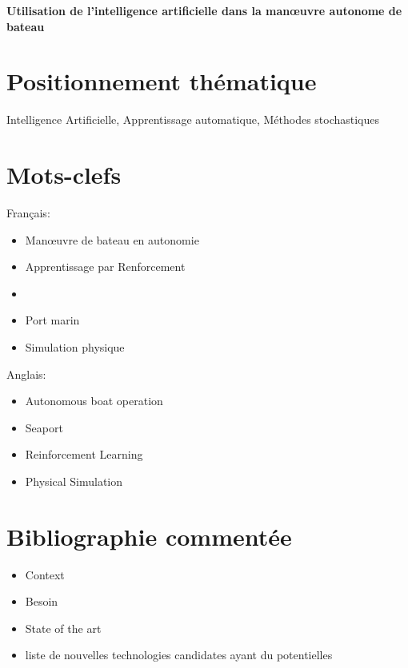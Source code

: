 \documentclass[12pt,a4paper]{extarticle}
\begin{document}
\begin{center}

\huge{ \bfseries Utilisation de l'intelligence artificielle dans la manœuvre autonome de bateau}
\end{center}

\section*{Positionnement thématique}

Intelligence Artificielle, Apprentissage automatique, Méthodes stochastiques

\section*{Mots-clefs}

\begin{multicols}{2}

Français:

\begin{itemize}

\item Manœuvre de bateau en autonomie
\item Apprentissage par Renforcement
\item 
\item Port marin
\item Simulation physique



\end{itemize}

Anglais:

\begin{itemize}

\item Autonomous boat operation
\item Seaport
\item Reinforcement Learning
\item Physical Simulation


\end{itemize}

\end{multicols}

\section*{Bibliographie commentée}

\begin{itemize}
\item Context
\item Besoin
\item State of the art
\item liste de nouvelles technologies candidates ayant du potentielles
\end{itemize}
\end{document}
